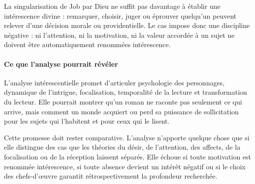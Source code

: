 \documentclass[10pt,a4paper]{article}
\begin{document}
La singularisation de Job par Dieu ne suffit pas davantage à établir une intérescence divine : remarquer, choisir, juger ou éprouver quelqu'un peuvent relever d'une décision morale ou providentielle. Le cas impose donc une discipline négative : ni l'attention, ni la motivation, ni la valeur accordée à un sujet ne doivent être automatiquement renommées intérescence.

\paragraph{Ce que l'analyse pourrait révéler}
L'analyse intérescentielle promet d'articuler psychologie des personnages, dynamique de l'intrigue, focalisation, temporalité de la lecture et transformation du lecteur. Elle pourrait montrer qu'un roman ne raconte pas seulement ce qui arrive, mais comment un monde acquiert ou perd sa puissance de sollicitation pour les sujets qui l'habitent et pour ceux qui le lisent.

Cette promesse doit rester comparative. L'analyse n'apporte quelque chose que si elle distingue des cas que les théories du désir, de l'attention, des affects, de la focalisation ou de la réception laissent séparés. Elle échoue si toute motivation est renommée intérescence, si toute absence devient un intérêt négatif ou si le choix des chefs-d'œuvre garantit rétrospectivement la profondeur recherchée.
\end{document}
